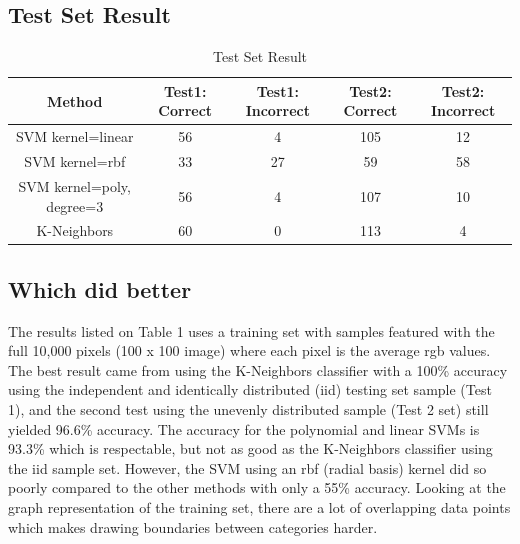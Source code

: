 \documentclass{article}
\begin{document}
    \subsection{Test Set Result}
   \begin{table}[h]
  	\centering
  	\caption{Test Set Result}
  	\label{tab:table1}
  	\begin{tabular}{|c|c|c|c|c|}
  	\hline
  	Method & Test1: Correct & Test1: Incorrect & Test2: Correct & Test2: Incorrect \\
  	\hline
  	SVM kernel=linear & 56 & 4 & 105 & 12 \\
  	\hline
  	SVM kernel=rbf & 33 & 27 & 59 & 58 \\
  	\hline
  	SVM kernel=poly, degree=3 & 56 & 4 & 107 & 10 \\
  	\hline
  	K-Neighbors & 60 & 0 & 113 & 4 \\
  	\hline
  \end{tabular}
  \end{table}
  
  \subsection{Which did better}
  The results listed on Table 1 uses a training set with samples featured with the full 10,000 pixels (100 x 100 image) where each pixel is the average rgb values. The best result came from using the K-Neighbors classifier with a 100\% accuracy using the independent and identically distributed (iid) testing set sample (Test 1), and the second test using the unevenly distributed sample (Test 2 set) still yielded 96.6\% accuracy. The accuracy for the polynomial and linear SVMs is 93.3\% which is respectable, but not as good as the K-Neighbors classifier using the iid sample set. However, the SVM using an rbf (radial basis) kernel did so poorly compared to the other methods with only a 55\% accuracy. Looking at the graph representation of the training set, there are a lot of overlapping data points which makes drawing boundaries between categories harder.\\
 
\end{document}

